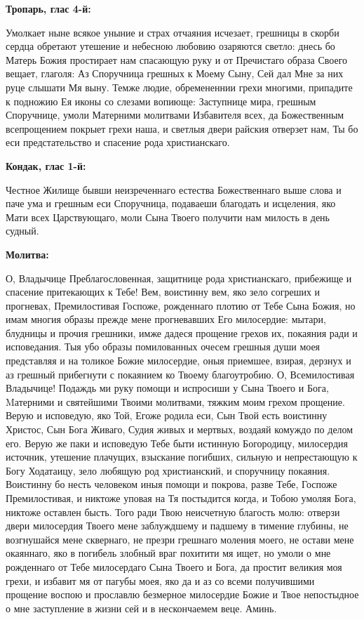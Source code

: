 
\bfseries Тропарь, глас 4-й:\normalfont{}\nopagebreak


Умолкает ныне всякое уныние и страх отчаяния исчезает, грешницы в скорби сердца обретают утешение и небесною любовию озаряются светло: днесь бо Матерь Божия простирает нам спасающую руку и от Пречистаго образа Своего вещает, глаголя: Аз Споручница грешных к Моему Сыну, Сей дал Мне за них руце слышати Мя выну. Темже людие, обремененнии грехи многими, припадите к подножию Ея иконы со слезами вопиюще: Заступнице мира, грешным Споручнице, умоли Матерними молитвами Избавителя всех, да Божественным всепрощением покрыет грехи наша, и светлыя двери райския отверзет нам, Ты бо еси предстательство и спасение рода христианскаго.


\medskip


\bfseries Кондак, глас 1-й:\normalfont{}\nopagebreak


Честное Жилище бывши неизреченнаго естества Божественнаго выше слова и паче ума и грешным еси Споручница, подаваеши благодать и исцеления, яко Мати всех Царствующаго, моли Сына Твоего получити нам милость в день судный.


\medskip


\bfseries Молитва:\normalfont{}\nopagebreak


О, Владычице Преблагословенная, защитнице рода христианскаго, прибежище и спасение притекающих к Тебе! Вем, воистинну вем, яко зело согреших и прогневах, Премилостивая Госпоже, рожденнаго плотию от Тебе Сына Божия, но имам многия образы прежде мене прогневавших Его милосердие: мытари, блудницы и прочия грешники, имже дадеся прощение грехов их, покаяния ради и исповедания. Тыя убо образы помилованных очесем грешныя души моея представляя и на толикое Божие милосердие, оныя приемшее, взирая, дерзнух и аз грешный прибегнути с покаянием ко Твоему благоутробию. О, Всемилостивая Владычице! Подаждь ми руку помощи и испросиши у Сына Твоего и Бога, Mатерними и святейшими Твоими молитвами, тяжким моим грехом прощение. Верую и исповедую, яко Той, Егоже родила еси, Сын Твой есть воистинну Христос, Сын Бога Живаго, Судия живых и мертвых, воздаяй комуждо по делом его. Верую же паки и исповедую Тебе быти истинную Богородицу, милосердия источник, утешение плачущих, взыскание погибших, сильную и непрестающую к Богу Ходатаицу, зело любящую род христианский, и споручницу покаяния. Воистинну бо несть человеком иныя помощи и покрова, разве Тебе, Госпоже Премилостивая, и никтоже уповая на Тя постыдится когда, и Тобою умоляя Бога, никтоже оставлен бысть. Того ради Твою неисчетную благость молю: отверзи двери милосердия Твоего мене заблуждшему и падшему в тимение глубины, не возгнушайся мене сквернаго, не презри грешнаго моления моего, не остави мене окаяннаго, яко в погибель злобный враг похитити мя ищет, но умоли о мне рожденнаго от Тебе милосердаго Сына Твоего и Бога, да простит великия моя грехи, и избавит мя от пагубы моея, яко да и аз со всеми получившими прощение воспою и прославлю безмерное милосердие Божие и Твое непостыдное о мне заступление в жизни сей и в нескончаемем веце. Аминь.
\nopagebreak\bigskip\bigskip\mychapterending

